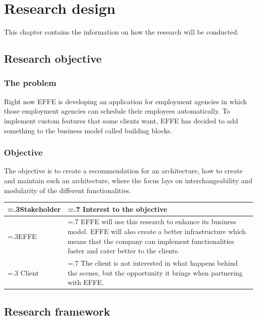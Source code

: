 
\chapter{Research design}
This chapter contains the information on how the research will be conducted.

\section{Research objective}

\subsection{The problem}
\label{sec:TheProblem}

Right now EFFE is developing an application for employment agencies in which those employment agencies can schedule their employees automatically. To implement custom features that some clients want, EFFE has decided to add something to the business model called building blocks.


\subsection{Objective}
The objective is to create a recommendation for an architecture, how to create and maintain such an architecture, where the focus lays on interchangeability and modularity of the different functionalities.

\begin{tabularx}{\linewidth}{|>{\hsize=.3\hsize}X|>{\hsize=.7\hsize}X|}
	\hline
	Stakeholder &
	Interest to the objective
	\\
	\hline
	EFFE &
	EFFE will use this research to enhance its business model. EFFE will also create a better infrastructure which means that the company can implement functionalities faster and cater better to the clients.
	\\
	\hline
	Client &
	The client is not interested in what happens behind the scenes, but the opportunity it brings when partnering with EFFE.
	\\
	\hline
\end{tabularx}

\section{Research framework}

